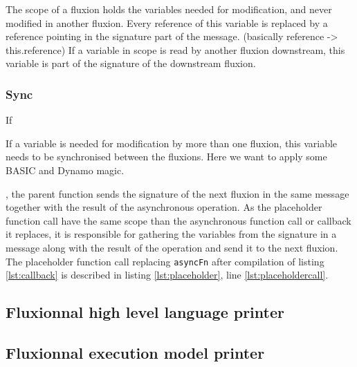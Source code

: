   The scope of a fluxion holds the variables needed for modification, and never modified in another fluxion.
  Every reference of this variable is replaced by a reference pointing in the signature part of the message.
  (basically reference -> this.reference)
  If a variable in scope is read by another fluxion downstream, this variable is part of the signature of the downstream fluxion.

\subsubsection{Sync}

  If 

  If a variable is needed for modification by more than one fluxion, this variable needs to be synchronised between the fluxions.
  Here we want to apply some BASIC and Dynamo magic.



, the parent function sends the signature of the next fluxion in the same message together with the result of the asynchronous operation.
As the placeholder function call have the same scope than the asynchronous function call or callback it replaces, it is responsible for gathering the variables from the signature in a message along with the result of the operation and send it to the next fluxion.
The placeholder function call replacing \texttt{asyncFn} after compilation of listing \ref{lst:callback} is described in listing \ref{lst:placeholder}, line \ref{lst:placeholdercall}.









\subsection{Fluxionnal high level language printer}






\subsection{Fluxionnal execution model printer}



















